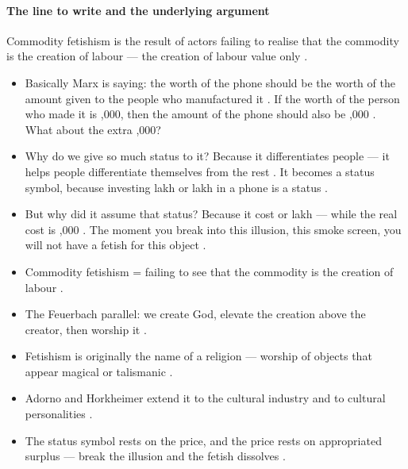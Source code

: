 \paragraph{The line to write and the underlying argument}
\begin{KeyConcept}
Commodity fetishism is the result of actors failing to realise that the commodity is the creation of labour --- the creation of labour value only .
\end{KeyConcept}

\begin{itemize}
    \item Basically Marx is saying: the worth of the phone should be the worth of the amount given to the people who manufactured it . If the worth of the person who made it is ,000, then the amount of the phone should also be ,000 . What about the extra ,000? 
    \item Why do we give so much status to it? Because it differentiates people --- it helps people differentiate themselves from the rest . It becomes a status symbol, because investing  lakh or  lakh in a phone is a status .
    \item But why did it assume that status? Because it cost  or  lakh --- while the real cost is ,000 . The moment you break into this illusion, this smoke screen, you will not have a fetish for this object .
\end{itemize}

\begin{QuickRevision}
\begin{itemize}
    \item Commodity fetishism = failing to see that the commodity is the creation of labour .
    \item The Feuerbach parallel: we create God, elevate the creation above the creator, then worship it .
    \item Fetishism is originally the name of a religion --- worship of objects that appear magical or talismanic .
    \item Adorno and Horkheimer extend it to the cultural industry and to cultural personalities .
    \item The status symbol rests on the price, and the price rests on appropriated surplus --- break the illusion and the fetish dissolves .
\end{itemize}
\end{QuickRevision}

